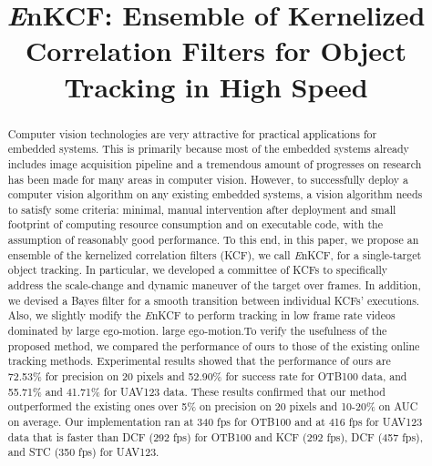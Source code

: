 \documentclass{bmvc2k}
\title{ {\it E}nKCF: Ensemble of Kernelized Correlation Filters for Object Tracking in High Speed}
\begin{document}
\maketitle

\begin{abstract}
Computer vision technologies are very attractive for practical
applications for embedded systems. This is primarily because most of
the embedded systems already includes image acquisition pipeline and a
tremendous amount of progresses on research has been made for many
areas in computer vision. However, to successfully deploy a computer
vision algorithm on any existing embedded systems, a vision algorithm
needs to satisfy some criteria: minimal, manual intervention after
deployment and small footprint of computing resource consumption and
on executable code, with the assumption of reasonably good
performance. To this end, in this paper, we propose an ensemble of the
kernelized correlation filters (KCF), we call {\it E}nKCF, for a
single-target object tracking. In particular, we developed a committee
of KCFs to specifically address the scale-change and dynamic maneuver
of the target over frames. In addition, we devised a Bayes filter for
a smooth transition between individual KCFs' executions. Also, we slightly
modify the {\it E}nKCF to perform tracking in low frame rate videos dominated by large ego-motion.
large ego-motion.To verify the usefulness of the proposed method, we compared the performance of ours to those
of the existing online tracking methods. Experimental results showed
that the performance of ours are 72.53\% for precision on 20 pixels
and 52.90\% for success rate for OTB100 data, and 55.71\% and 41.71\%
for UAV123 data. These results confirmed that our method outperformed
the existing ones over 5\% on precision on 20 pixels and 10-20\% on
AUC on average. Our implementation ran at 340 fps for OTB100 and at
416 fps for UAV123 data that is faster than DCF (292 fps) for OTB100
and KCF (292 fps), DCF (457 fps), and STC (350 fps) for UAV123.
\end{abstract}

\end{document}
